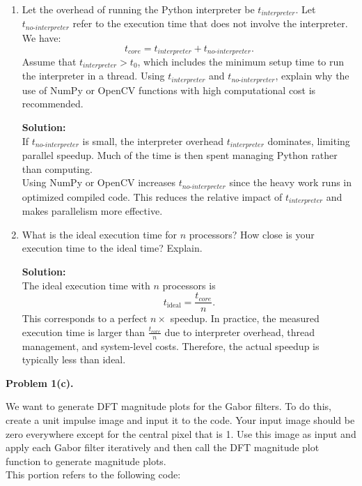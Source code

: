 \documentclass[11pt]{article}
\begin{document}
	\begin{enumerate}
		\item[i.] Let the overhead of running the Python interpreter be $t_{interpreter}$. Let $t_{no\text{-}interpreter}$ refer to the execution time that does not involve the interpreter. We have:
		\[
		t_{core} = t_{interpreter} + t_{no\text{-}interpreter}.
		\]
		Assume that $t_{interpreter} > t_{0}$, which includes the minimum setup time to run the interpreter in a thread. Using $t_{interpreter}$ and $t_{no\text{-}interpreter}$, explain why the use of NumPy or OpenCV functions with high computational cost is recommended.
		
		\textbf{Solution:}\\
		If $t_{no\text{-}interpreter}$ is small, the interpreter overhead $t_{interpreter}$ dominates, limiting parallel speedup. Much of the time is then spent managing Python rather than computing.\\
		
		Using NumPy or OpenCV increases $t_{no\text{-}interpreter}$ since the heavy work runs in optimized compiled code. This reduces the relative impact of $t_{interpreter}$ and makes parallelism more effective.
		
		\item[ii.] What is the ideal execution time for $n$ processors? How close is your execution time to the ideal time? Explain.
		
		\textbf{Solution:}\\
		The ideal execution time with $n$ processors is 
		\[
		t_{\text{ideal}} = \frac{t_{core}}{n}.
		\]
		This corresponds to a perfect $n\times$ speedup. In practice, the measured execution time is larger than $\frac{t_{core}}{n}$ due to interpreter overhead, thread management, and system-level costs. Therefore, the actual speedup is typically less than ideal.
	\end{enumerate}
	
	\newpage
	
	\textbf{Problem 1(c).}
	
	We want to generate DFT magnitude plots for the Gabor filters. To do this, create a unit impulse image and input it to the code. Your input image should be zero everywhere except for the central pixel that is 1. Use this image as input and apply each Gabor filter iteratively and then call the DFT magnitude plot function to generate magnitude plots.\\
	
	This portion refers to the following code:
	
\end{document}

